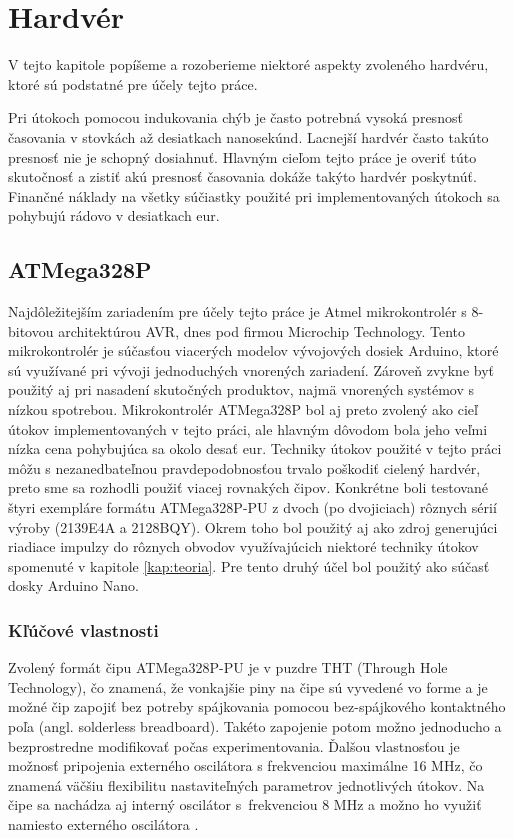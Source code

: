 \chapter{Hardvér}
\label{kap:hardver}

V tejto kapitole popíšeme a rozoberieme niektoré aspekty zvoleného hardvéru, ktoré sú podstatné pre účely tejto práce.

Pri útokoch pomocou indukovania chýb je často potrebná vysoká presnosť časovania v stovkách až desiatkach nanosekúnd. Lacnejší hardvér často takúto presnosť nie je schopný dosiahnuť. Hlavným cieľom tejto práce je overiť túto skutočnosť a zistiť akú presnosť časovania dokáže takýto hardvér poskytnúť. Finančné náklady na všetky súčiastky použité pri implementovaných útokoch sa pohybujú rádovo v desiatkach eur.

\section{ATMega328P} \label{kap2:sek:ATMega328P}
Najdôležitejším zariadením pre účely tejto práce je Atmel mikrokontrolér s 8-bitovou architektúrou AVR, dnes pod firmou Microchip Technology. Tento mikrokontrolér je súčasťou viacerých modelov vývojových dosiek Arduino, ktoré sú využívané pri vývoji jednoduchých vnorených zariadení. Zároveň zvykne byť použitý aj pri nasadení skutočných produktov, najmä vnorených systémov s nízkou spotrebou. Mikrokontrolér ATMega328P bol aj preto zvolený ako cieľ útokov implementovaných v tejto práci, ale hlavným dôvodom bola jeho veľmi nízka cena pohybujúca sa okolo desať eur. Techniky útokov použité v tejto práci môžu s nezanedbateľnou pravdepodobnosťou trvalo poškodiť cielený hardvér, preto sme sa rozhodli použiť viacej rovnakých čipov. Konkrétne boli testované štyri exempláre formátu ATMega328P-PU z dvoch (po dvojiciach) rôznych sérií výroby (2139E4A a 2128BQY). Okrem toho bol použitý aj ako zdroj generujúci riadiace impulzy do rôznych obvodov využívajúcich niektoré techniky útokov spomenuté v kapitole \ref{kap:teoria}. Pre tento druhý účel bol použitý ako súčasť dosky Arduino Nano.

\subsection{Kľúčové vlastnosti}
Zvolený formát čipu ATMega328P-PU je v puzdre THT (Through Hole Technology), čo znamená, že vonkajšie piny na čipe sú vyvedené vo forme  a je možné čip zapojiť bez potreby spájkovania pomocou bez-spájkového kontaktného poľa (angl. solderless breadboard). Takéto zapojenie potom možno jednoducho a bezprostredne modifikovať počas experimentovania. Ďalšou vlastnosťou je možnosť pripojenia externého oscilátora s frekvenciou maximálne 16 MHz, čo znamená väčšiu flexibilitu nastaviteľných parametrov jednotlivých útokov. Na čipe sa nachádza aj interný oscilátor s~frekvenciou 8 MHz a možno ho využiť namiesto externého oscilátora \cite{atmegaData}.

